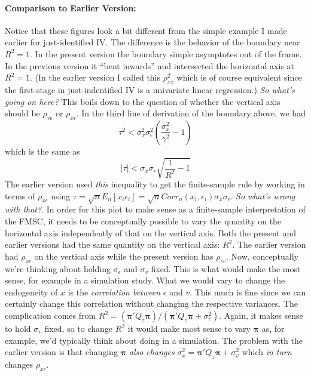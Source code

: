 \documentclass[12pt]{article}\usepackage[]{graphicx}\usepackage[]{color}
\theoremstyle{definition}
\begin{document}
\paragraph{Comparison to Earlier Version:} Notice that these figures look a bit different from the simple example I made earlier for just-identified IV. The difference is the behavior of the boundary near $R^2 = 1$. In the present version the boundary simple asymptotes out of the frame. In the previous version it ``bent inwards'' and intersected the horizontal axis at $R^2 = 1$. (In the earlier version I called this $\rho_{xz}^2$ which is of course equivalent since the first-stage in just-indentified IV is a univariate linear regression.) \emph{So what's going on here?} This boils down to the question of whether the vertical axis should be $\rho_{v\epsilon}$ or $\rho_{x\epsilon}$. In the third line of derivation of the boundary above, we had
  $$\tau^2 < \sigma_x^2 \sigma_\epsilon^2 \left(\frac{\sigma_x^2}{\gamma^2} - 1\right) $$
which is the same as
  $$|\tau|< \sigma_x \sigma_\epsilon \sqrt{\frac{1}{R^2} - 1}$$
The earlier version used \emph{this} inequality to get the finite-sample rule by working in terms of $\rho_{x\epsilon}$ using $\tau = \sqrt{n} E_n[x_i \epsilon_i] = \sqrt{n} Corr_n(x_i,\epsilon_i) \sigma_x \sigma_\epsilon$. \emph{So what's wrong with that?}. In order for this plot to make sense as a finite-sample interpretation of the FMSC, it needs to be conceptually possible to vary the quantity on the horizontal axis independently of that on the vertical axis. Both the present and earlier versions had the same quantity on the vertical axis: $R^2$. The earlier version had $\rho_{x\epsilon}$ on the vertical axis while the present version has $\rho_{\epsilon v}$. Now, conceptually we're thinking about holding $\sigma_\epsilon$ and $\sigma_v$ fixed. This is what would make the most sense, for example in a simulation study. What we would vary to change the endogeneity of $x$ is the \emph{correlation between} $\epsilon$ and $v$. This much is fine since we can certainly change this correlation without changing the respective variances. The complication comes from $R^2 = (\boldsymbol{\pi}'Q_z \boldsymbol{\pi})/(\boldsymbol{\pi}'Q_z \boldsymbol{\pi} + \sigma_v^2)$. Again, it makes sense to hold $\sigma_v$ fixed, so to change $R^2$ it would make most sense to vary $\mathbf{\pi}$ as, for example, we'd typically think about doing in a simulation. The problem with the earlier version is that changing $\mathbf{\pi}$ \emph{also changes} $\sigma^2_x = \boldsymbol{\pi}'Q_z \boldsymbol{\pi} + \sigma_v^2$ which  \emph{in turn} changes $\rho_{x\epsilon}$. 
\end{document}
